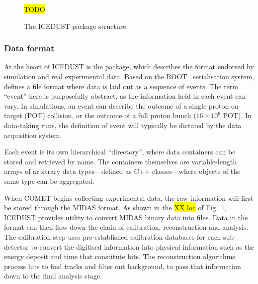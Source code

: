 \begin{figure}
    \centering
    \hl{TODO}
    \caption{The ICEDUST package structure.}
    \label{fig:icedust_schematic}
\end{figure}

\subsubsection{Data format}
At the heart of ICEDUST is the \oaEvent package, which describes the format endorsed by simulation and real experimental data. Based on the ROOT~\cite{BRUN199781} serialisation system, \oaEvent defines a file format where data is laid out as a sequence of events. The term ``event'' here is purposefully abstract, as the information held in each event can vary. In simulations, an event can describe the outcome of a single proton-on-target (POT) collision, or the outcome of a full proton bunch ($16\times10^6$ POT). 
In data-taking runs, the definition of event will typically be dictated by the data acquisition system.  %

Each event is its own hierarchical ``directory'', where data containers can be stored and retrieved by name. The containers themselves are variable-length arrays of arbitrary data types---defined as C++ classes---where objects of the same type can be aggregated.




When COMET begins collecting experimental data, the raw information will first be stored through the MIDAS format. 
As shown in the \hl{XX loc} of Fig.~\ref{fig:icedust_schematic}, ICEDUST provides utility to convert MIDAS binary data into \oaEvent files. Data in the \oaEvent format can then flow down the chain of calibration, reconstruction and analysis.
The calibration step uses pre-established calibration databases for each sub-detector to convert the digitised information into physical information such as the energy deposit and time that constitute hits. The reconstruction algorithms process hits to find tracks and filter out background, to pass that information down to the final analysis stage.


